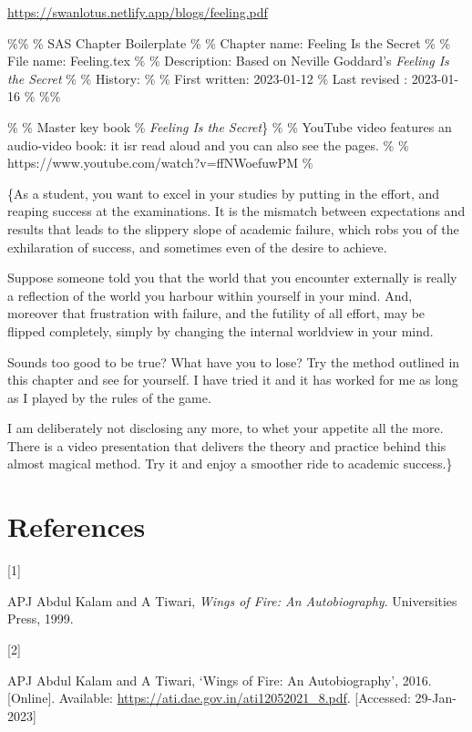 \documentclass[
  a4paper,
]{article}
\newlength{\cslhangindent}
\newlength{\csllabelwidth}
\newlength{\cslentryspacingunit} %
\newenvironment{CSLReferences}[2] %
 {%
  \setlength{\parindent}{0pt}
  \ifodd #1
  \let\oldpar\par
  \def\par{\hangindent=\cslhangindent\oldpar}
  \fi
  \setlength{\parskip}{#2\cslentryspacingunit}
 }%
 {}
\newcommand{\CSLLeftMargin}[1]{\parbox[t]{\csllabelwidth}{#1}}
\newcommand{\CSLRightInline}[1]{\parbox[t]{\linewidth - \csllabelwidth}{#1}\break}
\begin{document}
\begin{normalsize}

\begin{ttfamily}

\url{https://swanlotus.netlify.app/blogs/feeling.pdf}

\end{ttfamily}

\end{normalsize}

\%\% \% SAS Chapter Boilerplate \% \% Chapter name: Feeling Is the
Secret \% \% File name: Feeling.tex \% \% Description: Based on Neville
Goddard's \emph{Feeling Is the Secret} \% \% History: \% \% First
written: 2023-01-12 \% Last revised : 2023-01-16 \% \%\%

\% \% Master key book \% \textit{Feeling Is the Secret}\} \% \% YouTube
video features an audio-video book: it isr read aloud and you can also
see the pages. \% \% https://www.youtube.com/watch?v=ffNWoefuwPM \%

\{As a student, you want to excel in your studies by putting in the
effort, and reaping success at the examinations. It is the mismatch
between expectations and results that leads to the slippery slope of
academic failure, which robs you of the exhilaration of success, and
sometimes even of the desire to achieve.

Suppose someone told you that the world that you encounter externally is
really a reflection of the world you harbour within yourself in your
mind. And, moreover that frustration with failure, and the futility of
all effort, may be flipped completely, simply by changing the internal
worldview in your mind.

Sounds too good to be true? What have you to lose? Try the method
outlined in this chapter and see for yourself. I have tried it and it
has worked for me as long as I played by the rules of the game.

I am deliberately not disclosing any more, to whet your appetite all the
more. There is a video presentation that delivers the theory and
practice behind this almost magical method. Try it and enjoy a smoother
ride to academic success.\}

\hypertarget{bibliography}{%
\section*{References}\label{bibliography}}

\hypertarget{refs}{}
\begin{CSLReferences}{0}{0}
\leavevmode{}%
\CSLLeftMargin{{[}1{]} }%
\CSLRightInline{APJ Abdul Kalam and A Tiwari, \emph{{Wings of Fire: An
Autobiography}}. Universities Press, 1999. }

\leavevmode{}%
\CSLLeftMargin{{[}2{]} }%
\CSLRightInline{APJ Abdul Kalam and A Tiwari, {`{Wings of Fire: An
Autobiography}'}, 2016. {[}Online{]}. Available:
\url{https://ati.dae.gov.in/ati12052021_8.pdf}. {[}Accessed:
29-Jan-2023{]}}

\end{CSLReferences}
\end{document}

